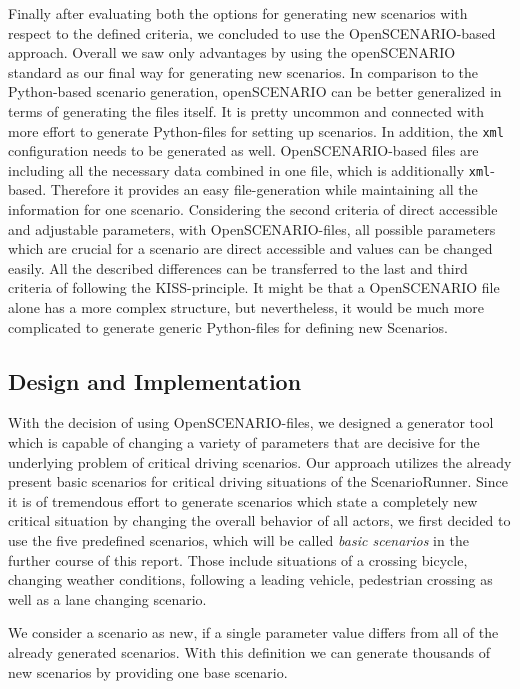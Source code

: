 \documentclass[conference, 11pt]{IEEEtran}
\begin{document}
Finally after evaluating both the options for generating new scenarios with respect to the defined criteria, we concluded to use the OpenSCENARIO-based approach. Overall we saw only advantages by using the openSCENARIO standard as our final way for generating new scenarios. In comparison to the Python-based scenario generation, openSCENARIO can be better generalized in terms of generating the files itself. It is pretty uncommon and connected with more effort to generate Python-files for setting up scenarios. In addition, the \texttt{xml} configuration needs to be generated as well. OpenSCENARIO-based files are including all the necessary data combined in one file, which is additionally \texttt{xml}-based. Therefore it provides an easy file-generation while maintaining all the information for one scenario. Considering the second criteria of direct accessible and adjustable parameters, with OpenSCENARIO-files, all possible parameters which are crucial for a scenario are direct accessible and values can be changed easily.
All the described differences can be transferred to the last and third criteria of following the KISS-principle. It might be that a OpenSCENARIO file alone has a more complex structure, but nevertheless, it would be much more complicated to generate generic Python-files for defining new Scenarios.

\subsection{Design and Implementation}
With the decision of using OpenSCENARIO-files, we designed a generator tool which is capable of changing a variety of parameters that are decisive for the underlying problem of critical driving scenarios. Our approach utilizes the already present basic scenarios for critical driving situations of the ScenarioRunner. Since it is of tremendous effort to generate scenarios which state a completely new critical situation by changing the overall behavior of all actors, we first decided to use the five predefined scenarios, which will be called \textit{basic scenarios} in the further course of this report. Those include situations of a crossing bicycle,  changing weather conditions, following a leading vehicle, pedestrian crossing as well as a lane changing scenario.

We consider a scenario as new, if a single parameter value differs from all of the already generated scenarios. With this definition we can generate thousands of new scenarios by providing one base scenario.
\end{document}
